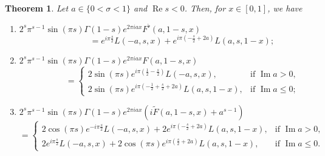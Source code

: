 \documentclass[11pt,a4paper,reqno]{amsart}
\let\tilde\widetilde
\renewcommand{\Re}{\operatorname{Re}}
\renewcommand{\Im}{\operatorname{Im}}
\theoremstyle{plain}
\newtheorem{theorem}{Theorem}%
\theoremstyle{remark}
\numberwithin{equation}{section}
\begin{document}
\begin{theorem}
\label{theo:FintermsofL}
Let $a\in\{0<\sigma<1\}$ and $\Re s<0$. Then, for $x\in[0,1]$, we have
\begin{enumerate}
  \item\label{item:Fb}
   $\displaystyle 2^s\pi^{s-1}\sin(\pi s)\Gamma(1-s)e^{2\pi iax}F^{\flat}(a,1-s,x)$
\[
\qquad\qquad=
   e^{i\pi\frac s2}L(-a,s,x)+ e^{i\pi(-\frac s2 +2a)}L(a,s,1-x);
\]
  \item\label{item:F} 
  $\displaystyle 2^s\pi^{s-1}\sin(\pi s)\Gamma(1-s)e^{2\pi iax}F(a,1-s,x)$
\[
\qquad\qquad=
  \begin{cases}
    2\sin(\pi s)e^{i\pi(\frac12-\frac s2)}L(-a,s,x), & \text{if $\Im a>0$,} \\
    2\sin(\pi s)e^{i\pi(-\frac12+\frac s2 +2a)}L(a,s,1-x), & \text{if $\Im a\leq 0$;}
  \end{cases}
\]
  \item\label{item:Fconj} 
  $\displaystyle 2^s\pi^{s-1}\sin(\pi s)\Gamma(1-s)e^{2\pi iax}
  \left(i\tilde{F}(a,1-s,x)+a^{s-1}\right)$
\[
=
  \begin{cases}
    2\cos(\pi s)e^{-i\pi\frac s2}L(-a,s,x) + 2e^{i\pi(-\frac s2 +2a)}L(a,s,1-x),
    & \text{if $\Im a>0$,}
    \\
    2e^{i\pi\frac s2}L(-a,s,x) + 2\cos(\pi s)e^{i\pi(\frac s2 +2a)}L(a,s,1-x), 
    & \text{if $\Im a\leq 0$}.
  \end{cases}
\]
\end{enumerate}
\end{theorem}
\end{document}
